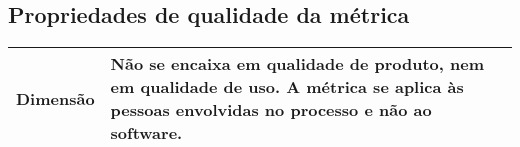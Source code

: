 	\subsection{Propriedades de qualidade da métrica}

	\begin{tabular}{ |p{4cm}|p{8cm}| }
	 \hline
	   Dimensão 		& 	Não se encaixa em qualidade de produto, nem em qualidade de uso. A métrica se aplica às pessoas envolvidas no processo e não ao software.	 \\
	 \hline
	\end{tabular}

